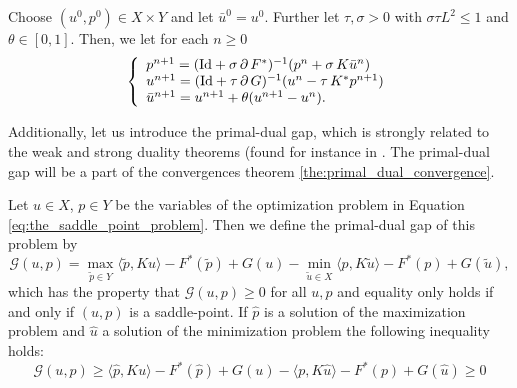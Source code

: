     \begin{algorithm}
    \label{alg:fast_primal_dual_algorithm}
        Choose $(u^{0}, p^{0}) \in X \times Y$ and let $\bar{u}^{0} = u^{0}$. Further let $\tau, \sigma > 0$ with $\sigma\tau L^{2} \le 1$ and $\theta \in [0, 1]$. Then, we let for each $n \ge 0$
            \begin{equation}
                \left\{ 
                    \begin{array}{l l}
                        p^{n+1} = (\textnormal{Id} + \sigma\,\partial\,F^{\ast})^{-1}(p^{n} + \sigma\,K\bar{u}^{n}) \\
                        u^{n+1} = (\textnormal{Id} + \tau\,\partial\,G)^{-1}(u^{n} - \tau\,K^{\ast}p^{n+1}) \\
                        \bar{u}^{n+1} = u^{n+1} + \theta (u^{n+1} - u^{n}).
                    \end{array}
                \right.
            \label{eq:fast_primal_dual_algorithm}
            \end{equation}
    \end{algorithm}

    Additionally, let us introduce the primal-dual gap, which is strongly related to the weak and strong duality theorems (found for instance in \cite{Geiger-Kanzow}. The primal-dual gap will be a part of the convergences theorem \ref{the:primal_dual_convergence}.
    \begin{definition} %
    \label{def:primal_dual_gap}

        Let $u \in X$, $p \in Y$ be the variables of the optimization problem in Equation \ref{eq:the_saddle_point_problem}. Then we define the primal-dual gap of this problem by
            \begin{equation}
                \mathcal{G}(u, p) = \max_{\tilde{p} \in Y} \langle \tilde{p}, Ku \rangle - F^{\ast}(\tilde{p}) + G(u) - \min_{\tilde{u} \in X} \langle p, K\tilde{u} \rangle - F^{\ast}(p) + G(\tilde{u}),
                \label{eq:primal_dual_gap}
            \end{equation}
        which has the property that $\mathcal{G}(u, p) \ge 0$ for all $u, p$ and equality only holds if and only if $(u, p)$ is a saddle-point. If $\hat{p}$ is a solution of the maximization problem and $\hat{u}$ a solution of the minimization problem the following inequality holds:
            \begin{equation}
                \mathcal{G}(u, p) \ge \langle \hat{p}, Ku \rangle - F^{\ast}(\hat{p}) + G(u) - \langle p, K\hat{u} \rangle - F^{\ast}(p) + G(\hat{u}) \ge 0
                \label{eq:primal_dual_gap}
            \end{equation}
    \end{definition}

